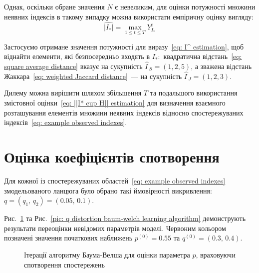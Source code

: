 Однак, оскільки обране значення $N$ є невеликим, для оцінки потужності множини неявних індексів в такому випадку можна використати емпіричну оцінку вигляду:
\begin{equation*}
    \widehat{|I_*|}=\max\limits_{1\leqslant t \leqslant T} Y^t_{I_*}
\end{equation*}

Застосуємо отримане значення потужності для виразу~\eqref{eq: I^ estimation}, щоб віднайти елементи, які безпосередньо входять в $I_*:$ квадратична відстань~\eqref{eq: square average distance} вказує на сукупність $\widehat{I\,}_S=(1,2,5)$, а зважена відстань Жаккара~\eqref{eq: weighted Jaccard distance}~--- на сукупність $\widehat{I\,}_J=(1,2,3)$.

Дилему можна вирішити шляхом збільшення $T$ та подальшого використання змістовної оцінки~\eqref{eq: ||I* cup H|| estimation} для визначення взаємного розташування елементів множини неявних індексів відносно спостережуваних індексів~\eqref{eq: example observed indexes}.

\section{Оцінка коефіцієнтів спотворення}

Для кожної із спостережуваних областей~\eqref{eq: example observed indexes} змодельованого ланцюга було обрано такі ймовірності викривлення: $q = (q_1,\,q_2) = (0.05,\,0.1)$. 

Рис.~\ref{pic: p distortion baum-welch learning algorithm} та Рис.~\ref{pic: q distortion baum-welch learning algorithm} демонструють результати переоцінки невідомих параметрів моделі. Червоним кольором позначені значення початкових наближень $p^{(0)}=0.55$ та $q^{(0)}=(0.3,\,0.4)$. 

\begin{figure}[H]\centering
    \setfontsize{14pt}
    \caption{Ітерації алгоритму Баума-Велша для оцінки параметра $p$, враховуючи спотворення спостережень}
    \label{pic: p distortion baum-welch learning algorithm}
\end{figure}

